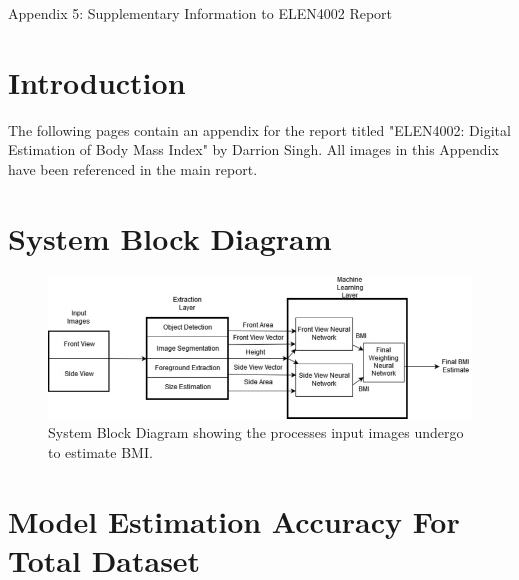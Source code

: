 \documentclass[conference]{IEEEtran}
\begin{document}
\onecolumn
\begin{center}
\LARGE Appendix 5: Supplementary Information to ELEN4002 Report
\end{center}
\section{Introduction}
The following pages contain an appendix for the report titled "ELEN4002: Digital Estimation of Body Mass Index" by Darrion Singh.
All images in this Appendix have been referenced in the main report.
\section{System Block Diagram}
\begin{figure}[H]
    \centering
    \includegraphics[width=\linewidth]{systemblock.png}
    \caption{System Block Diagram showing the processes input images undergo to estimate BMI.}
    \label{fig:systemblockdiagram}
\end{figure}

\section{Model Estimation Accuracy For Total Dataset}
\end{document}
